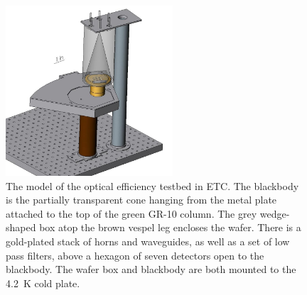 \begin{figure}[htp]
\begin{center}
\includegraphics[height=2.5in]{figures/optical_efficiency_setup.jpg}
\caption{The model of the optical efficiency testbed in \ac{ETC}. 
The blackbody is the partially transparent cone hanging from the metal plate attached to the top of the green GR-10 column. 
The grey wedge-shaped box atop the brown vespel leg encloses the wafer. 
There is a gold-plated stack of horns and waveguides, as well as a set of low pass filters, above a hexagon of seven detectors open to the blackbody. 
The wafer box and blackbody are both mounted to the 4.2~K cold plate. 
\label{fig:opt_eff_setup} }
\end{center}
\end{figure}




